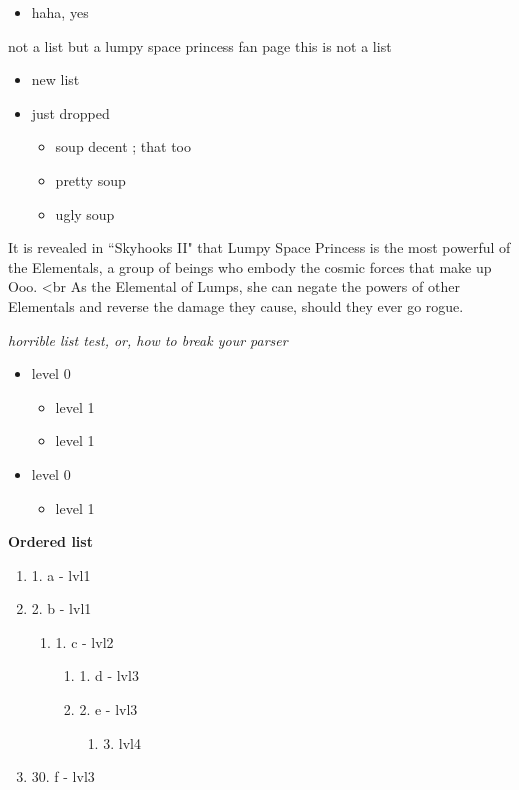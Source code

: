 \begin{itemize}
\item haha, yes 

\end{itemize}

not a list but a lumpy space princess fan page
this is not a list



\begin{itemize}
\item new list
\item just dropped
\begin{itemize} 
 \item soup decent ; that too
\item pretty soup
\item ugly soup 
\end{itemize}

\end{itemize}

It is revealed in ``Skyhooks II" that Lumpy Space Princess is the most powerful of the Elementals, a group of beings who embody the cosmic forces that make up Ooo. <br As the Elemental of Lumps, she can negate the powers of other Elementals and reverse the damage they cause, should they ever go rogue.


\textit{horrible list test, or, how to break your parser}



\begin{itemize}
\item level 0
\begin{itemize} 
 \item level 1
\item level 1
\end{itemize}
\item level 0
\begin{itemize} 
 \item level 1 
\end{itemize}

\end{itemize}


\textbf{Ordered list}



\begin{enumerate}
    \item 1. a - lvl1
    \item 2. b - lvl1
    \begin{enumerate}
        \item 1. c - lvl2
        \begin{enumerate}
            \item 1. d - lvl3
            \item 2. e - lvl3
            \begin{enumerate}
                \item 3. lvl4
            \end{enumerate}
        \end{enumerate}
    \end{enumerate}
\item 30. f - lvl3
\end{enumerate}


